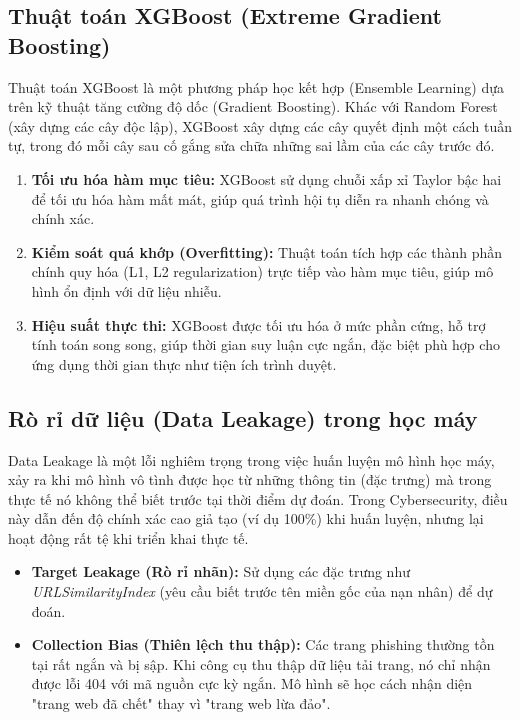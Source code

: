 \subsection{Thuật toán XGBoost (Extreme Gradient Boosting)}
Thuật toán XGBoost là một phương pháp học kết hợp (Ensemble Learning) dựa trên kỹ thuật tăng cường độ dốc (Gradient Boosting). Khác với Random Forest (xây dựng các cây độc lập), XGBoost xây dựng các cây quyết định một cách tuần tự, trong đó mỗi cây sau cố gắng sửa chữa những sai lầm của các cây trước đó.
\begin{enumerate}
    \item \textbf{Tối ưu hóa hàm mục tiêu:} XGBoost sử dụng chuỗi xấp xỉ Taylor bậc hai để tối ưu hóa hàm mất mát, giúp quá trình hội tụ diễn ra nhanh chóng và chính xác.
    \item \textbf{Kiểm soát quá khớp (Overfitting):} Thuật toán tích hợp các thành phần chính quy hóa (L1, L2 regularization) trực tiếp vào hàm mục tiêu, giúp mô hình ổn định với dữ liệu nhiễu.
    \item \textbf{Hiệu suất thực thi:} XGBoost được tối ưu hóa ở mức phần cứng, hỗ trợ tính toán song song, giúp thời gian suy luận cực ngắn, đặc biệt phù hợp cho ứng dụng thời gian thực như tiện ích trình duyệt.
\end{enumerate}

\subsection{Rò rỉ dữ liệu (Data Leakage) trong học máy}
Data Leakage là một lỗi nghiêm trọng trong việc huấn luyện mô hình học máy, xảy ra khi mô hình vô tình được học từ những thông tin (đặc trưng) mà trong thực tế nó không thể biết trước tại thời điểm dự đoán. Trong Cybersecurity, điều này dẫn đến độ chính xác cao giả tạo (ví dụ 100\%) khi huấn luyện, nhưng lại hoạt động rất tệ khi triển khai thực tế.
\begin{itemize}
    \item \textbf{Target Leakage (Rò rỉ nhãn):} Sử dụng các đặc trưng như \textit{URLSimilarityIndex} (yêu cầu biết trước tên miền gốc của nạn nhân) để dự đoán.
    \item \textbf{Collection Bias (Thiên lệch thu thập):} Các trang phishing thường tồn tại rất ngắn và bị sập. Khi công cụ thu thập dữ liệu tải trang, nó chỉ nhận được lỗi 404 với mã nguồn cực kỳ ngắn. Mô hình sẽ học cách nhận diện "trang web đã chết" thay vì "trang web lừa đảo".
\end{itemize}

